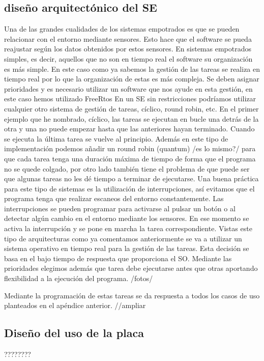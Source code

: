 \subsection{diseño arquitectónico del SE}
Una de las grandes cualidades de los sistemas empotrados es que se pueden relacionar con el entorno mediante sensores. Esto hace que el software se pueda reajustar según los datos obtenidos por estos sensores. 
En sistemas empotrados simples, es decir, aquellos que no son en tiempo real el software su organización es más simple. En este caso como ya sabemos la gestión de las tareas se realiza en tiempo real por lo que la organización de estas es más compleja. Se deben asignar prioridades y es necesario utilizar un software que nos ayude en esta gestión, en este caso hemos utilizado FreeRtos
En un SE sin restricciones podríamos utilizar cualquier otro sistema de gestión de tareas, cíclico, round robin, etc. En el primer ejemplo que he nombrado, cíclico, las tareas se ejecutan en bucle una detrás de la otra y una no puede empezar hasta que las anteriores hayan terminado. Cuando se ejecuta la última tarea se vuelve al principio. Además en este tipo de implementación podemos añadir un round robin (quantum) /es lo mismo?/  para que cada tarea tenga una duración máxima de tiempo de forma que el programa no se quede colgado, por otro lado también tiene el problema de que puede ser que algunas tareas no les dé tiempo a terminar de ejecutarse. 
Una buena práctica para este tipo de sistemas es la utilización de interrupciones, así evitamos que el programa tenga que realizar escaneos del entorno constantemente. Las interrupciones se pueden programar para activarse al pulsar un botón o al detectar algún cambio en el entorno mediante los sensores. En ese momento se activa la interrupción y se pone en marcha la tarea correspondiente.
Vistas este tipo de arquitecturas como ya comentamos anteriormente se va a utilizar un sistema operativo en tiempo real para la gestión de las tareas. Esta decisión se basa en el bajo tiempo de respuesta que proporciona el SO. Mediante las prioridades elegimos además que tarea debe ejecutarse antes que otras aportando flexibilidad a la ejecución del programa.
/fotos/

Mediante la programación de estas tareas se da respuesta a todos los casos de uso planteados en el apéndice anterior. //ampliar

\subsection{Diseño del uso de la placa}
????????

